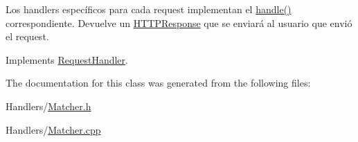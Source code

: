 Los handlers específicos para cada request implementan el \hyperlink{class_matcher_aa88fa5bbb00fe8a0a4b6405f8c22ffa3}{handle()} correspondiente. Devuelve un \hyperlink{class_h_t_t_p_response}{H\+T\+T\+P\+Response} que se enviará al usuario que envió el request. 



Implements \hyperlink{class_request_handler_ada5c3c1669e6c2e4b46923a42b1fdab6}{Request\+Handler}.



The documentation for this class was generated from the following files\+:\begin{DoxyCompactItemize}
\item 
Handlers/\hyperlink{_matcher_8h}{Matcher.\+h}\item 
Handlers/\hyperlink{_matcher_8cpp}{Matcher.\+cpp}\end{DoxyCompactItemize}

